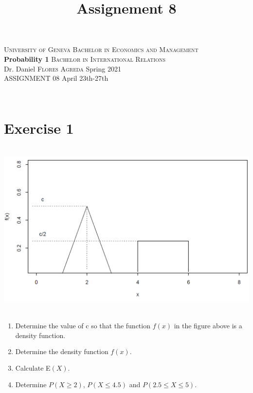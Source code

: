 \documentclass[12pt,thmsa]{article}\usepackage[]{graphicx}\usepackage[]{color}
\title{Assignement 8}
\begin{document}
\noindent \textsc{University of Geneva}     \hfill \textsc{Bachelor in Economics and Management} \\
\textbf{Probability 1}                      \hfill \textsc{Bachelor in International Relations} \\
Dr. Daniel \textsc{Flores Agreda}                 \hfill Spring 2021  \\
ASSIGNMENT 08                               \hfill   April 23th-27th



\noindent
\makebox[\linewidth]{\rule{\textwidth}{0.4pt}}\\[1.5ex]

\section*{Exercise 1}
\centerline{\includegraphics[height=9cm]{figure.png}}
\bigskip

\begin{enumerate}%
\item Determine the value of c so that the function $f(x)$ in the figure above is a density function. %

\item Determine the density function $f(x)$.
\item Calculate E$(X)$.
\item Determine $P(X \geq 2)$, $P(X \leq 4.5)$ and $P(2.5 \leq X \leq
5)$.
\end{enumerate}
\end{document}
